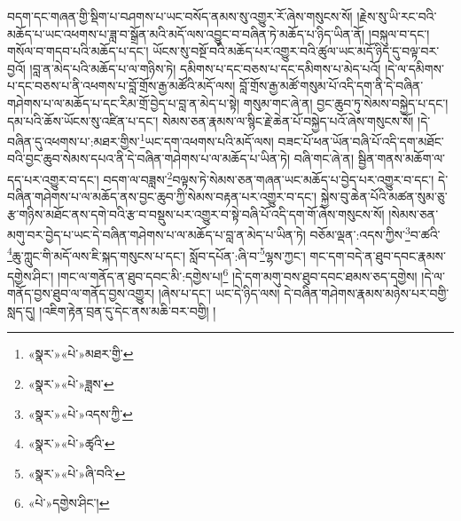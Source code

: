 བདག་དང་གཞན་གྱི་སྡིག་པ་བཤགས་པ་ཡང་བསོད་ནམས་སུ་འགྱུར་རོ་ཞེས་གསུངས་སོ། །རྗེས་སུ་ཡི་རང་བའི་མཆོད་པ་ཡང་འཕགས་པ་ཟླ་བ་སྒྲོན་མའི་མདོ་ལས་འབྱུང་བ་བཞིན་ཏེ་མཆོད་པ་ཉིད་ཡིན་ནོ། །བསྐུལ་བ་དང་། གསོལ་བ་གདབ་པའི་མཆོད་པ་དང་། ཡོངས་སུ་བསྔོ་བའི་མཆོད་པར་འགྱུར་བའི་ཚུལ་ཡང་མདོ་ཉིད་དུ་བལྟ་བར་བྱའོ། །བླ་ན་མེད་པའི་མཆོད་པ་ལ་གཉིས་ཏེ། དམིགས་པ་དང་བཅས་པ་དང་དམིགས་པ་མེད་པའོ། །དེ་ལ་དམིགས་པ་དང་བཅས་པ་ནི་འཕགས་པ་བློ་གྲོས་རྒྱ་མཚོའི་མདོ་ལས། བློ་གྲོས་རྒྱ་མཚོ་གསུམ་པོ་འདི་དག་ནི་དེ་བཞིན་གཤེགས་པ་ལ་མཆོད་པ་དང་རིམ་གྲོ་བྱེད་པ་བླ་ན་མེད་པ་སྟེ། གསུམ་གང་ཞེ་ན། བྱང་ཆུབ་ཏུ་སེམས་བསྐྱེད་པ་དང་། དམ་པའི་ཆོས་ཡོངས་སུ་འཛིན་པ་དང་། སེམས་ཅན་རྣམས་ལ་སྙིང་རྗེ་ཆེན་པོ་བསྐྱེད་པའོ་ཞེས་གསུངས་སོ། །དེ་བཞིན་དུ་འཕགས་པ་:མཐར་གྱིས་\footnote{«སྣར་»«པེ་»མཐར་གྱི་}ཡང་དག་འཕགས་པའི་མདོ་ལས། བཟང་པོ་ཕན་ཡོན་བཞི་པོ་འདི་དག་མཐོང་བའི་བྱང་ཆུབ་སེམས་དཔའ་ནི་དེ་བཞིན་གཤེགས་པ་ལ་མཆོད་པ་ཡིན་ཏེ། བཞི་གང་ཞེ་ན། སྦྱིན་གནས་མཆོག་ལ་དད་པར་འགྱུར་བ་དང་། བདག་ལ་བཟླས་\footnote{«སྣར་»«པེ་»ཟླས་}བལྟས་ཏེ་སེམས་ཅན་གཞན་ཡང་མཆོད་པ་བྱེད་པར་འགྱུར་བ་དང་། དེ་བཞིན་གཤེགས་པ་ལ་མཆོད་ནས་བྱང་ཆུབ་ཀྱི་སེམས་བརྟན་པར་འགྱུར་བ་དང་། སྐྱེས་བུ་ཆེན་པོའི་མཚན་སུམ་ཅུ་རྩ་གཉིས་མཐོང་ནས་དགེ་བའི་རྩ་བ་བསྡུས་པར་འགྱུར་བ་སྟེ་བཞི་པོ་འདི་དག་གོ་ཞེས་གསུངས་སོ། །སེམས་ཅན་མགུ་བར་བྱེད་པ་ཡང་དེ་བཞིན་གཤེགས་པ་ལ་མཆོད་པ་བླ་ན་མེད་པ་ཡིན་ཏེ། བཅོམ་ལྡན་:འདས་ཀྱིས་\footnote{«སྣར་»«པེ་»འདས་ཀྱི་}བ་ཚའི་\footnote{«སྣར་»«པེ་»ཚྭའི་}ཆུ་ཀླུང་གི་མདོ་ལས་ཇི་སྐད་གསུངས་པ་དང་། སློབ་དཔོན་:ཞི་བ་\footnote{«སྣར་»«པེ་»ཞི་བའི་}ལྷས་ཀྱང་། གང་དག་བདེ་ན་ཐུབ་དབང་རྣམས་དགྱེས་ཤིང་། །གང་ལ་གནོད་ན་ཐུབ་དབང་མི་:དགྱེས་པ།\footnote{«པེ་»དགྱེས་ཤིང་།} །དེ་དག་མགུ་བས་ཐུབ་དབང་ཐམས་ཅད་དགྱེས། །དེ་ལ་གནོད་བྱས་ཐུབ་ལ་གནོད་བྱས་འགྱུར། །ཞེས་པ་དང་། ཡང་དེ་ཉིད་ལས། དེ་བཞིན་གཤེགས་རྣམས་མཉེས་པར་བགྱི་སླད་དུ། །འཇིག་རྟེན་བྲན་དུ་དེང་ནས་མཆི་བར་བགྱི། །
